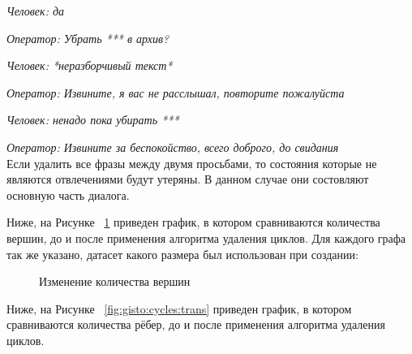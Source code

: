 \documentclass[times,specification,annotation]{itmo-student-thesis}
\begin{document}
	\textit{Человек:  да}
	
	\textit{Оператор:  Убрать *** в архив?}
	
	\textit{Человек:  *неразборчивый текст*}
	
	\textit{Оператор:  Извините, я вас не расслышал, повторите пожалуйста}
	
	\textit{Человек:  ненадо пока убирать ***}
	
	\textit{Оператор:  Извините за беспокойство, всего доброго, до свидания}\\
	
	Если удалить все фразы между двумя просьбами, то состояния которые не являются отвлечениями будут утеряны. В данном случае они состовляют основную часть диалога.
		
	Ниже, на Рисунке ~\ref{fig:gisto:cycles:vertexes} приведен график, в котором сравниваются количества вершин, до и после применения  алгоритма удаления циклов. Для каждого графа так же указано, датасет какого размера был использован при создании:\\
	
	
	\begin{figure}[H]
		\caption{Изменение количества вершин}
		\label{fig:gisto:cycles:vertexes}
	\end{figure}

	Ниже, на Рисунке ~\ref{fig:gisto:cycles:trans} приведен график, в котором сравниваются количества рёбер, до и после применения  алгоритма удаления циклов.
	
\end{document}
